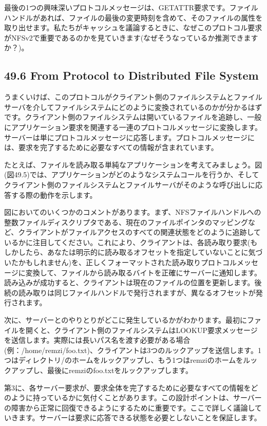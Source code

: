 最後の1つの興味深いプロトコルメッセージは、GETATTR要求です。ファイルハンドルがあれば、ファイルの最後の変更時刻を含めて、そのファイルの属性を取り出せます。私たちがキャッシュを議論するときに、なぜこのプロトコル要求がNFSv2で重要であるのかを見ていきます(なぜそうなっているか推測できますか？)。

\hypertarget{from-protocol-to-distributed-file-system}{%
\subsection*{49.6 From Protocol to Distributed File
System}\label{from-protocol-to-distributed-file-system}}

うまくいけば、このプロトコルがクライアント側のファイルシステムとファイルサーバを介してファイルシステムにどのように変換されているのかが分かるはずです。クライアント側のファイルシステムは開いているファイルを追跡し、一般にアプリケーション要求を関連する一連のプロトコルメッセージに変換します。サーバーは単にプロトコルメッセージに応答します。プロトコルメッセージには、要求を完了するために必要なすべての情報が含まれています。

たとえば、ファイルを読み取る単純なアプリケーションを考えてみましょう。図(図49.5)では、アプリケーションがどのようなシステムコールを行うか、そしてクライアント側のファイルシステムとファイルサーバがそのような呼び出しに応答する際の動作を示します。

図においてのいくつかのコメントがあります。まず、NFSファイルハンドルへの整数ファイルディスクリプタである、現在のファイルポインタのマッピングなど、クライアントがファイルアクセスのすべての関連状態をどのように追跡しているかに注目してください。これにより、クライアントは、各読み取り要求(もしかしたら、あなたは明示的に読み取るオフセットを指定していないことに気づいたかもしれません)を、正しくフォーマットされた読み取りプロトコルメッセージに変換して、ファイルから読み取るバイトを正確にサーバーに通知します。読み込みが成功すると、クライアントは現在のファイルの位置を更新します。後続の読み取りは同じファイルハンドルで発行されますが、異なるオフセットが発行されます。

次に、サーバーとのやりとりがどこに発生しているかがわかります。最初にファイルを開くと、クライアント側のファイルシステムはLOOKUP要求メッセージを送信します。実際には長いパス名を渡す必要がある場合(例：/home/remzi/foo.txt)、クライアントは3つのルックアップを送信します。1つはディレクトリ/のホームをルックアップし、もう1つはremziのホームをルックアップし、最後にremziのfoo.txtをルックアップします。

第3に、各サーバー要求が、要求全体を完了するために必要なすべての情報をどのように持っているかに気付くことがあります。この設計ポイントは、サーバーの障害から正常に回復できるようにするために重要です。ここで詳しく議論していきます。サーバーは要求に応答できる状態を必要としないことを保証します。

